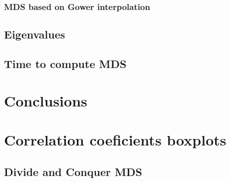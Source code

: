 \documentclass[11pt]{report}
\begin{document}
\subsection{MDS based on Gower interpolation}




\section{Eigenvalues}


\section{Time to compute MDS}

\chapter{Conclusions}

%




\appendix 

\chapter{Correlation coeficients boxplots}

\section{Divide and Conquer MDS}
\label{div_conquer_corr}

%
%
%
%
\end{document}
